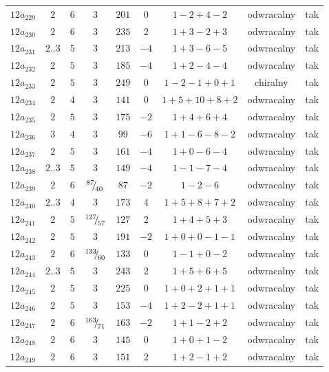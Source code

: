 \begin{longtable}{ccccccccc}
$12a_{229}$ & $2$ & $6$ & $3$ & $201$ & $0$ & $1-2+4-2$ & odwracalny & tak \\
$12a_{230}$ & $2$ & $6$ & $3$ & $235$ & $2$ & $1+3-2+3$ & odwracalny & tak \\
$12a_{231}$ & $2..3$ & $5$ & $3$ & $213$ & $-4$ & $1+3-6-5$ & odwracalny & tak \\
$12a_{232}$ & $2$ & $5$ & $3$ & $185$ & $-4$ & $1+2-4-4$ & odwracalny & tak \\
$12a_{233}$ & $2$ & $5$ & $3$ & $249$ & $0$ & $1-2-1+0+1$ & chiralny & tak \\
$12a_{234}$ & $2$ & $4$ & $3$ & $141$ & $0$ & $1+5+10+8+2$ & odwracalny & tak \\
$12a_{235}$ & $2$ & $5$ & $3$ & $175$ & $-2$ & $1+4+6+4$ & odwracalny & tak \\
$12a_{236}$ & $3$ & $4$ & $3$ & $99$ & $-6$ & $1+1-6-8-2$ & odwracalny & tak \\
$12a_{237}$ & $2$ & $5$ & $3$ & $161$ & $-4$ & $1+0-6-4$ & odwracalny & tak \\
$12a_{238}$ & $2..3$ & $5$ & $3$ & $149$ & $-4$ & $1-1-7-4$ & odwracalny & tak \\
$12a_{239}$ & $2$ & $6$ & ${}^{87}{\mskip -5mu/\mskip -3mu}_{40}$ & $87$ & $-2$ & $1-2-6$ & odwracalny & tak \\
$12a_{240}$ & $2..3$ & $4$ & $3$ & $173$ & $4$ & $1+5+8+7+2$ & odwracalny & tak \\
$12a_{241}$ & $2$ & $5$ & ${}^{127}{\mskip -5mu/\mskip -3mu}_{57}$ & $127$ & $2$ & $1+4+5+3$ & odwracalny & tak \\
$12a_{242}$ & $2$ & $5$ & $3$ & $191$ & $-2$ & $1+0+0-1-1$ & odwracalny & tak \\
$12a_{243}$ & $2$ & $6$ & ${}^{133}{\mskip -5mu/\mskip -3mu}_{60}$ & $133$ & $0$ & $1-1+0-2$ & odwracalny & tak \\
$12a_{244}$ & $2..3$ & $5$ & $3$ & $243$ & $2$ & $1+5+6+5$ & odwracalny & tak \\
$12a_{245}$ & $2$ & $5$ & $3$ & $225$ & $0$ & $1+0+2+1+1$ & odwracalny & tak \\
$12a_{246}$ & $2$ & $5$ & $3$ & $153$ & $-4$ & $1+2-2+1+1$ & odwracalny & tak \\
$12a_{247}$ & $2$ & $6$ & ${}^{163}{\mskip -5mu/\mskip -3mu}_{71}$ & $163$ & $-2$ & $1+1-2+2$ & odwracalny & tak \\
$12a_{248}$ & $2$ & $6$ & $3$ & $145$ & $0$ & $1+0+1-2$ & odwracalny & tak \\
$12a_{249}$ & $2$ & $6$ & $3$ & $151$ & $2$ & $1+2-1+2$ & odwracalny & tak \\

\end{longtable}
